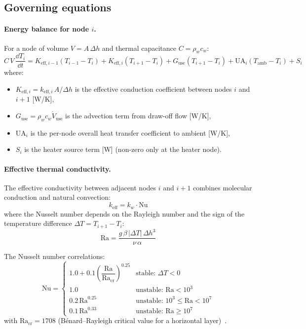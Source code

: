 \subsection{Governing equations}

\paragraph{Energy balance for node $i$.}
For a node of volume $V = A\,\Delta h$ and thermal capacitance $C = \rho_w c_w$:
\begin{equation}\label{eq:tank-energy}
  C\,V\,\frac{\dd T_i}{\dd t}
  = K_{\text{eff},i-1}(T_{i-1} - T_i)
  + K_{\text{eff},i}(T_{i+1} - T_i)
  + G_\text{use}(T_{i+1} - T_i)
  + \text{UA}_i(T_\text{amb} - T_i)
  + S_i
\end{equation}
where:
\begin{itemize}
  \item $K_{\text{eff},i} = k_{\text{eff},i}\,A / \Delta h$ is the effective conduction coefficient between nodes $i$ and $i+1$ [W/K],
  \item $G_\text{use} = \rho_w c_w \dot{V}_\text{use}$ is the advection term from draw-off flow [W/K],
  \item $\text{UA}_i$ is the per-node overall heat transfer coefficient to ambient [W/K],
  \item $S_i$ is the heater source term [W] (non-zero only at the heater node).
\end{itemize}

\paragraph{Effective thermal conductivity.}
The effective conductivity between adjacent nodes $i$ and $i+1$ combines molecular conduction and natural convection:
\begin{equation}\label{eq:tank-keff}
  k_{\text{eff}} = k_w \cdot \text{Nu}
\end{equation}
where the Nusselt number depends on the Rayleigh number and the sign of the temperature difference $\Delta T = T_{i+1} - T_i$:
\begin{equation}\label{eq:tank-Ra}
  \text{Ra} = \frac{g\,\beta\,|\Delta T|\,\Delta h^3}{\nu\,\alpha}
\end{equation}

The Nusselt number correlations:
\begin{equation}\label{eq:tank-Nu}
  \text{Nu} = \begin{cases}
    1.0 + 0.1\left(\dfrac{\text{Ra}}{\text{Ra}_\text{cr}}\right)^{0.25}
      & \text{stable: } \Delta T < 0 \\[8pt]
    1.0   & \text{unstable: } \text{Ra} < 10^3 \\
    0.2\,\text{Ra}^{0.25} & \text{unstable: } 10^3 \le \text{Ra} < 10^7 \\
    0.1\,\text{Ra}^{0.33} & \text{unstable: } \text{Ra} \ge 10^7
  \end{cases}
\end{equation}
with $\text{Ra}_\text{cr} = 1708$ (B\'{e}nard--Rayleigh critical value for a horizontal layer)~\cite{incropera2006}.

